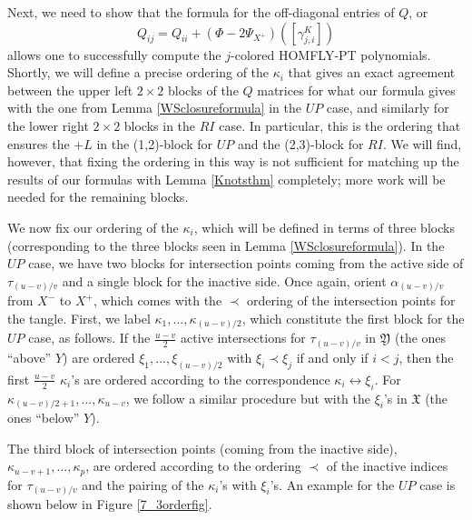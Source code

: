 \documentclass[11pt]{amsart}
\theoremstyle{plain}
\theoremstyle{definition}
\theoremstyle{remark}
\begin{document}
Next, we need to show that the formula for the off-diagonal entries of $Q$, or 
\[
Q_{ij}=Q_{ii}+(\Phi-2\Psi_{X^+})([\gamma^K_{j,i}])
\]
allows one to successfully compute the $j$-colored HOMFLY-PT polynomials. Shortly, we will define a precise ordering of the $\kappa_i$ that gives an exact agreement between the upper left $2\times 2$ blocks of the $Q$ matrices for what our formula gives with the one from Lemma \ref{WSclosureformula} in the $UP$ case, and similarly for the lower right $2\times 2$ blocks in the $RI$ case. In particular, this is the ordering that ensures the $+L$ in the (1,2)-block for $UP$ and the (2,3)-block for $RI$. We will find, however, that fixing the ordering in this way is not sufficient for matching up the results of our formulas with Lemma \ref{Knotsthm} completely; more work will be needed for the remaining blocks. 

We now fix our ordering of the $\kappa_i$, which will be defined in terms of three blocks (corresponding to the three blocks seen in Lemma \ref{WSclosureformula}). In the $UP$ case, we have two blocks for intersection points coming from the active side of $\tau_{(u-v)/v}$ and a single block for the inactive side. Once again, orient $\alpha_{(u-v)/v}$ from $X^-$ to $X^+$, which comes with the $\prec$ ordering of the intersection points for the tangle. First, we label $\kappa_1,...,\kappa_{(u-v)/2}$, which constitute the first block for the $UP$ case, as follows. If the $\frac{u-v}{2}$ active intersections for $\tau_{(u-v)/v}$ in $\mathfrak{Y}$ (the ones ``above'' $Y$) are ordered $\xi_1,...,\xi_{(u-v)/2}$ with $\xi_i\prec \xi_j$ if and only if $i<j$, then the first $\frac{u-v}{2}$ $\kappa_i$'s are ordered according to the correspondence $\kappa_i\leftrightarrow \xi_i$. For $\kappa_{(u-v)/2+1},...,\kappa_{u-v}$, we follow a similar procedure but with the $\xi_i$'s in $\mathfrak{X}$ (the ones ``below'' $Y$). 

The third block of intersection points (coming from the inactive side), $\kappa_{u-v+1},...,\kappa_p$, are ordered according to the ordering $\prec$ of the inactive indices for $\tau_{(u-v)/v}$ and the pairing of the $\kappa_i$'s with $\xi_i$'s. An example for the $UP$ case is shown below in Figure \ref{7_3orderfig}.
\end{document}
